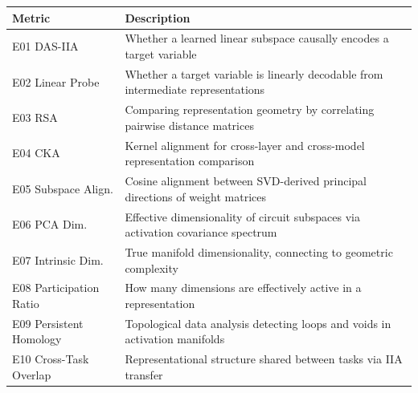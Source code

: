 \documentclass{article}
\begin{document}
\begin{minipage}{\linewidth}
\par
\begin{center}
\begin{tabular}{@{}lp{10cm}@{}}
\toprule
\textbf{Metric} & \textbf{Description} \\
\midrule
E01 DAS-IIA & Whether a learned linear subspace causally encodes a target variable \\
\midrule
E02 Linear Probe & Whether a target variable is linearly decodable from intermediate representations \\
\midrule
E03 RSA & Comparing representation geometry by correlating pairwise distance matrices \\
\midrule
E04 CKA & Kernel alignment for cross-layer and cross-model representation comparison \\
\midrule
E05 Subspace Align. & Cosine alignment between SVD-derived principal directions of weight matrices \\
\midrule
E06 PCA Dim. & Effective dimensionality of circuit subspaces via activation covariance spectrum \\
\midrule
E07 Intrinsic Dim. & True manifold dimensionality, connecting to geometric complexity \\
\midrule
E08 Participation Ratio & How many dimensions are effectively active in a representation \\
\midrule
E09 Persistent Homology & Topological data analysis detecting loops and voids in activation manifolds \\
\midrule
E10 Cross-Task Overlap & Representational structure shared between tasks via IIA transfer \\
\bottomrule
\end{tabular}
\end{center}
\end{minipage}

\end{document}
